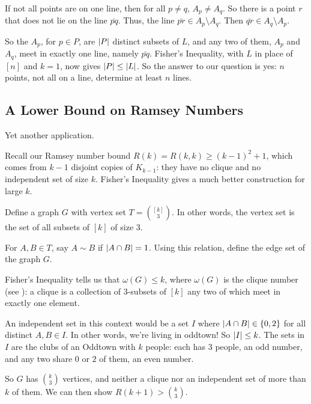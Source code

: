 If not all points are on one line, then for all $p \neq q$, $A_p \neq A_q$. So there is a point $r$ that does not lie on the line $\bar{pq}$. Thus, the line $\bar{pr} \in A_p \setminus A_q$. Then $\bar{qr} \in A_q \setminus A_p$.

So the $A_p$, for $p \in P$, are $\left\lvert P \right\rvert$ distinct subsets of $L$, and any two of them, $A_p$ and $A_q$, meet in exactly one line, namely $\bar{pq}$. Fisher's Inequality, with $L$ in place of $[n]$ and $k = 1$, now gives $\left\lvert P \right\rvert \leq \left\lvert L \right\rvert$. So the answer to our question is yes: $n$ points, not all on a line, determine at least $n$ lines.

\subsection{A Lower Bound on Ramsey Numbers}

Yet another application.

Recall our Ramsey number bound $R(k) = R(k, k) \geq (k - 1)^2 + 1$, which comes from $k - 1$ disjoint copies of $K_{k - 1}$: they have no clique and no independent set of size $k$. Fisher's Inequality gives a much better construction for large $k$.

Define a graph $G$ with vertex set $T = \binom{[k]}{3}$. In other words, the vertex set is the set of all subsets of $[k]$ of size $3$.

For $A, B \in T$, say $A \sim B$ if $\left\lvert A \cap B \right\rvert = 1$. Using this relation, define the edge set of the graph $G$.

Fisher's Inequality tells us that $\omega(G) \leq k$, where $\omega(G)$ is the clique number (see ): a clique is a collection of $3$-subsets of $[k]$ any two of which meet in exactly one element.

An independent set in this context would be a set $I$ where $\left\lvert A \cap B \right\rvert \in \left\{ 0, 2 \right\}$ for all distinct $A, B \in I$. In other words, we're living in oddtown! So $\left\lvert I \right\rvert \leq k$. The sets in $I$ are the clubs of an Oddtown with $k$ people: each has $3$ people, an odd number, and any two share $0$ or $2$ of them, an even number.

So $G$ has $\binom{k}{3}$ vertices, and neither a clique nor an independent set of more than $k$ of them. We can then show $R(k + 1) > \binom{k}{3}$.